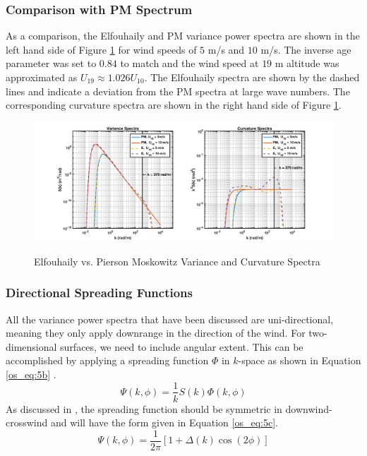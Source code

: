 \subsubsection{Comparison with PM Spectrum}
As a comparison, the Elfouhaily and PM variance power spectra are shown in the left hand side of Figure \ref{os_fig:2} for wind speeds of $5$ m/s and $10$ m/s. The inverse age parameter was set to $0.84$ to match and the wind speed at $19$ m altitude was approximated as $U_{19} \approx 1.026 U_{10}$. The Elfouhaily spectra are shown by the dashed lines and indicate a deviation from the PM spectra at large wave numbers. The corresponding curvature spectra are shown in the right hand side of Figure \ref{os_fig:2}. 
\begin{figure}[H]
  \begin{center}
\includegraphics[width=6in]{../media/Ocean_Surface/elf_vs_PM_variance_curvature_spectrum.png}
  \end{center}
  \renewcommand{\baselinestretch}{1} \small\normalsize
  \begin{quote}
    \caption[Elfouhaily vs. Pierson Moskowitz Variance and Curvature Spectra]{Elfouhaily vs. Pierson Moskowitz Variance and Curvature Spectra\label{os_fig:2}}
  \end{quote}
\end{figure}
\renewcommand{\baselinestretch}{2} \small\normalsize

\subsubsection{Directional Spreading Functions}
All the variance power spectra that have been discussed are uni-directional, meaning they only apply downrange in the direction of the wind. For two-dimensional surfaces, we need to include angular extent. This can be accomplished by applying a spreading function $\Phi$ in $k$-space as shown in Equation \ref{os_eq:5b} \cite{elfouhaily}.
\begin{equation}
\label{os_eq:5b}
\Psi(k,\phi) = \frac{1}{k}S(k)\Phi(k,\phi)
\end{equation}
\renewcommand{\baselinestretch}{2} \small\normalsize
As discussed in \cite{elfouhaily}, the spreading function should be symmetric in downwind-crosswind and will have the form given in Equation \ref{os_eq:5c}.
\begin{equation}
\label{os_eq:5c}
\Psi(k,\phi) = \frac{1}{2\pi}\left[1 + \Delta(k)\cos(2\phi) \right]
\end{equation}
\renewcommand{\baselinestretch}{2} \small\normalsize

